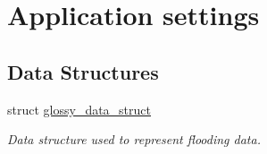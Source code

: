 \hypertarget{group__glossy-test-settings}{
\section{Application settings}
\label{group__glossy-test-settings}
}
\subsection*{Data Structures}
\begin{DoxyCompactItemize}
\item 
struct \hyperlink{structglossy__data__struct}{glossy\_\-data\_\-struct}
\begin{DoxyCompactList}\small\item\em Data structure used to represent flooding data. \end{DoxyCompactList}\end{DoxyCompactItemize}
